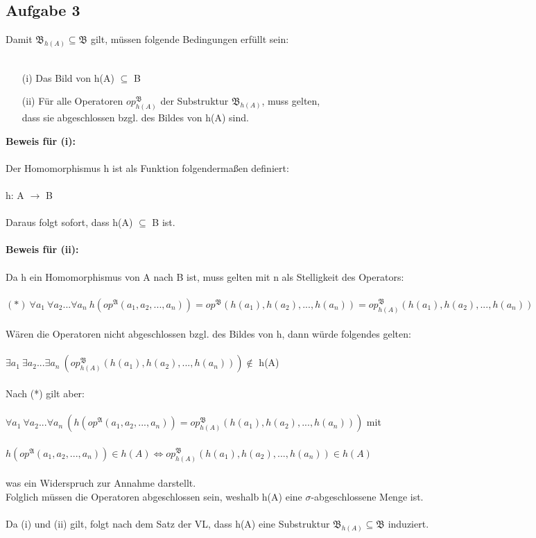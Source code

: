 \documentclass[a4paper,10pt]{article}
\begin{document}
\subsection*{Aufgabe 3}
Damit $\mathfrak{B}_{h(A)} \subseteq \mathfrak{B}$ gilt, müssen folgende Bedingungen erfüllt sein: \\
\\
\begin{enumerate}
\item[(i)]
Das Bild von h(A) $\subseteq$ B 

\item[(ii)]
Für alle Operatoren $op^\mathfrak{B}_{h(A)}$ der Substruktur $\mathfrak{B}_{h(A)}$, muss gelten, \\
dass sie abgeschlossen bzgl. des Bildes von h(A) sind.

\end{enumerate}

\textbf{Beweis für (i):} \\
\\
Der Homomorphismus h ist als Funktion folgendermaßen definiert: \\
\\
h: A $\rightarrow$ B \\
\\
Daraus folgt sofort, dass h(A) $\subseteq$ B ist. \\
\\
\textbf{Beweis für (ii): }\\
\\
Da h ein Homomorphismus von A  nach B ist, muss gelten mit n als Stelligkeit des Operators: \\
\\
\( (*)~ \forall a_1~ \forall a_2 ... \forall a_n~ h(op^{\mathfrak{A}}(a_1,a_2,...,a_n)) 
= op^{\mathfrak{B}}(h(a_1),h(a_2),...,h(a_n)) 
= op^{\mathfrak{B}}_{h(A)}(h(a_1),h(a_2),...,h(a_n))\) \\
\\
Wären die Operatoren nicht abgeschlossen bzgl. des Bildes von h, dann würde folgendes gelten: \\
\\
$\exists a_1~ \exists a_2 ... \exists a_n~ (op^\mathfrak{B}_{h(A)} (h(a_1),h(a_2),...,h(a_n))) \notin$ h(A) \\
\\
Nach (*) gilt aber: \\
\\
$\forall a_1~ \forall a_2 ... \forall a_n~ 
(h(op^{\mathfrak{A}}(a_1,a_2,...,a_n)) = op^{\mathfrak{B}}_{h(A)}(h(a_1),h(a_2),...,h(a_n)) )$ mit\\
\\
$h(op^{\mathfrak{A}}(a_1,a_2,...,a_n)) \in h(A) \Leftrightarrow op^{\mathfrak{B}}_{h(A)}(h(a_1),h(a_2),...,h(a_n)) \in h(A)$ \\
\\
was ein Widerspruch zur Annahme darstellt.\\
Folglich müssen die Operatoren abgeschlossen sein, weshalb h(A) eine $\sigma$-abgeschlossene Menge ist. \\
\\
Da (i) und (ii) gilt, folgt nach dem Satz der VL, dass h(A) eine Substruktur 
$\mathfrak{B}_{h(A)} \subseteq \mathfrak{B}$ induziert.
\end{document}
